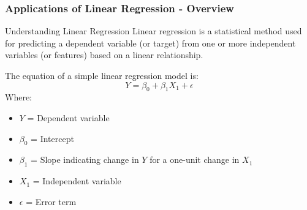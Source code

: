 \documentclass[aspectratio=169]{beamer}
\begin{document}
\begin{frame}[fragile]
    \frametitle{Applications of Linear Regression - Overview}
    \begin{block}{Understanding Linear Regression}
        Linear regression is a statistical method used for predicting a dependent variable (or target) from one or more independent variables (or features) based on a linear relationship.
    \end{block}
    The equation of a simple linear regression model is:
    \begin{equation}
        Y = \beta_0 + \beta_1X_1 + \epsilon
    \end{equation}
    Where:
    \begin{itemize}
        \item $Y$ = Dependent variable
        \item $\beta_0$ = Intercept
        \item $\beta_1$ = Slope indicating change in $Y$ for a one-unit change in $X_1$
        \item $X_1$ = Independent variable
        \item $\epsilon$ = Error term
    \end{itemize}
\end{frame}
\end{document}
